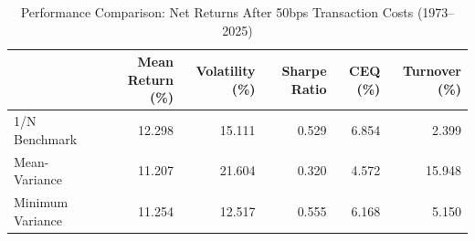 \begin{table}
\caption{Performance Comparison: Net Returns After 50bps Transaction Costs (1973--2025)}
\label{tab:performance}
\begin{tabular}{lrrrrr}
\toprule
 & Mean Return (\%) & Volatility (\%) & Sharpe Ratio & CEQ (\%) & Turnover (\%) \\
\midrule
1/N Benchmark & 12.298 & 15.111 & 0.529 & 6.854 & 2.399 \\
Mean-Variance & 11.207 & 21.604 & 0.320 & 4.572 & 15.948 \\
Minimum Variance & 11.254 & 12.517 & 0.555 & 6.168 & 5.150 \\
\bottomrule
\end{tabular}
\end{table}
